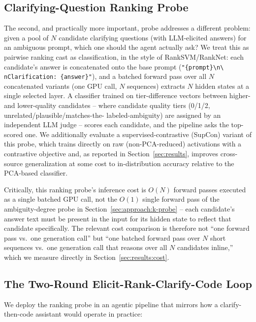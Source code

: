 \subsection{Clarifying-Question Ranking Probe}
\label{sec:approach:rank-probe}

The second, and practically more important, probe addresses a different
problem: given a pool of $N$ candidate clarifying questions (with
LLM-elicited answers) for an ambiguous prompt, which one should the agent
actually ask? We treat this as pairwise ranking cast as classification, in
the style of RankSVM/RankNet: each candidate's answer is concatenated onto
the base prompt (\texttt{"\{prompt\}\textbackslash n\textbackslash
nClarification: \{answer\}"}), and a batched forward pass over all $N$
concatenated variants (one GPU call, $N$ sequences) extracts $N$ hidden
states at a single selected layer. A classifier trained on
tier-difference vectors between higher- and lower-quality candidates --
where candidate quality tiers (0/1/2, unrelated/plausible/matches-the-
labeled-ambiguity) are assigned by an independent LLM judge -- scores each
candidate, and the pipeline asks the top-scored one. We additionally
evaluate a supervised-contrastive (SupCon) variant of this probe, which
trains directly on raw (non-PCA-reduced) activations with a contrastive
objective and, as reported in Section~\ref{sec:results}, improves
cross-source generalization at some cost to in-distribution accuracy
relative to the PCA-based classifier.

Critically, this ranking probe's inference cost is $O(N)$ forward passes
executed as a single batched GPU call, not the $O(1)$ single forward pass
of the ambiguity-degree probe in Section~\ref{sec:approach:k-probe} --
each candidate's answer text must be present in the input for its
hidden state to reflect that candidate specifically. The relevant cost
comparison is therefore not ``one forward pass vs.\ one generation call''
but ``one batched forward pass over $N$ short sequences vs.\ one
generation call that reasons over all $N$ candidates inline,'' which we
measure directly in Section~\ref{sec:results:cost}.

\subsection{The Two-Round Elicit-Rank-Clarify-Code Loop}
\label{sec:approach:loop}

We deploy the ranking probe in an agentic pipeline that mirrors how a
clarify-then-code assistant would operate in practice:

